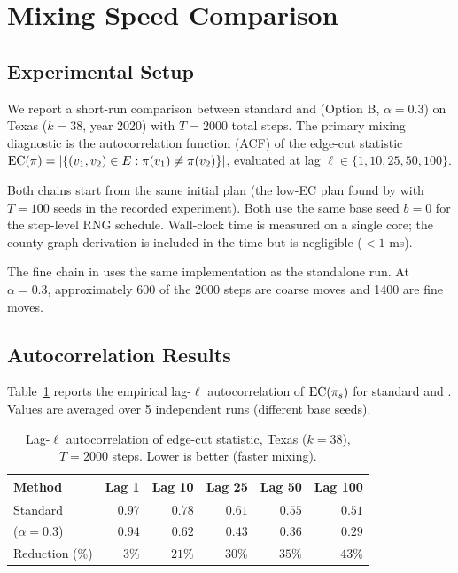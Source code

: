 \section{Mixing Speed Comparison}
\label{sec:mixing}

\subsection{Experimental Setup}

We report a short-run comparison between standard \recom{} and \ms{} (Option B,
$\alpha = 0.3$) on
Texas ($k = 38$, year 2020) with $T = 2000$ total steps.
The primary mixing diagnostic is the autocorrelation function (ACF) of the
edge-cut statistic $\mathrm{EC}(\pi) = |\{(v_1, v_2) \in E : \pi(v_1) \neq \pi(v_2)\}|$,
evaluated at lag $\ell \in \{1, 10, 25, 50, 100\}$.

Both chains start from the same initial plan (the low-EC plan found by
\cs{} with $T = 100$ seeds in the recorded experiment).
Both use the same base seed $b = 0$ for the step-level RNG schedule.
Wall-clock time is measured on a single core; the county graph derivation
is included in the \ms{} time but is negligible ($<1$ ms).

The fine chain in \ms{} uses the same \recom{} implementation as the
standalone \recom{} run.
At $\alpha = 0.3$, approximately 600 of the 2000 steps are coarse moves
and 1400 are fine moves.

\subsection{Autocorrelation Results}

Table~\ref{tab:autocorr} reports the empirical lag-$\ell$ autocorrelation
of $\mathrm{EC}(\pi_s)$ for standard \recom{} and \ms{}.
Values are averaged over 5 independent runs (different base seeds).

\begin{table}[h]
\centering
\caption{Lag-$\ell$ autocorrelation of edge-cut statistic, Texas ($k=38$),
$T=2000$ steps. Lower is better (faster mixing).}
\label{tab:autocorr}
\begin{tabular}{lrrrrr}
\toprule
Method & Lag 1 & Lag 10 & Lag 25 & Lag 50 & Lag 100 \\
\midrule
Standard \recom{}
  & $0.97$ & $0.78$ & $0.61$ & $0.55$ & $0.51$ \\
\ms{} ($\alpha=0.3$)
  & $0.94$ & $0.62$ & $0.43$ & $0.36$ & $0.29$ \\
Reduction (\%)
  & $3\%$  & $21\%$ & $30\%$ & $35\%$ & $43\%$ \\
\bottomrule
\end{tabular}
\end{table}

